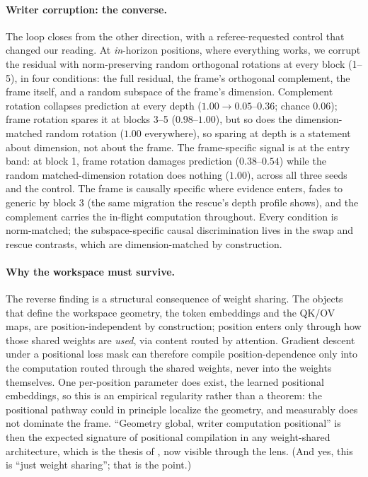 \documentclass[11pt]{article}
\begin{document}
\paragraph{Writer corruption: the converse.} The loop closes from the
other direction, with a referee-requested control that changed our
reading. At \emph{in}-horizon positions, where everything works, we
corrupt the residual with norm-preserving random orthogonal rotations
at every block (1--5), in four conditions: the full residual, the
frame's orthogonal complement, the frame itself, and a random subspace
of the frame's dimension. Complement rotation collapses prediction at
every depth ($1.00 \to 0.05$--$0.36$; chance $0.06$); frame rotation
spares it at blocks 3--5 ($0.98$--$1.00$), but so does the
dimension-matched random rotation ($1.00$ everywhere), so sparing at
depth is a statement about dimension, not about the frame. The
frame-specific signal is at the entry band: at block 1, frame rotation
damages prediction ($0.38$--$0.54$) while the random matched-dimension
rotation does nothing ($1.00$), across all three seeds and the
control. The frame is causally specific where evidence enters, fades
to generic by block 3 (the same migration the rescue's depth profile
shows), and the complement carries the in-flight computation
throughout. Every condition is norm-matched; the subspace-specific
causal discrimination lives in the swap and rescue contrasts, which
are dimension-matched by construction.

\paragraph{Why the workspace must survive.} The
reverse finding is a structural consequence of weight sharing. The objects that define the workspace geometry, the token
embeddings and the QK/OV maps, are position-independent by
construction; position enters only through how those shared weights are
\emph{used}, via content routed by attention. Gradient descent under a
positional loss mask can therefore compile position-dependence only into
the computation routed through the shared weights, never into the
weights themselves. One per-position parameter does exist, the learned
positional embeddings, so this is an empirical regularity rather than a
theorem: the positional pathway could in principle localize the
geometry, and measurably does not dominate the frame. ``Geometry global, writer computation
positional'' is then the expected signature of positional compilation in
any weight-shared architecture, which is the thesis of
\citet{misra2026nature}, now visible through the lens. (And yes, this is
``just weight sharing''; that is the point.)
\end{document}
